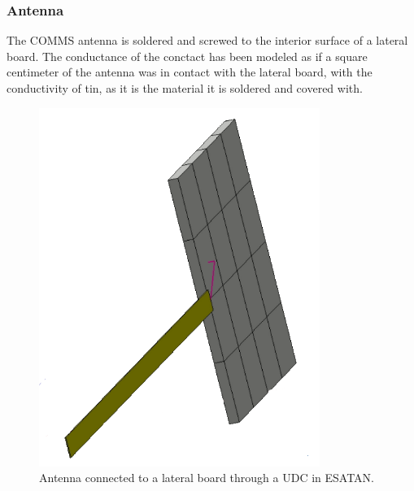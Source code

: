 \subsubsection{Antenna}

The COMMS antenna is soldered and screwed to the interior surface of a lateral board. The conductance of the conctact
has been modeled as if a square centimeter of the antenna was in contact with the lateral board, with the conductivity of
tin, as it is the material it is soldered and covered with.

\begin{figure}[H]
    \centering
    \includegraphics[width=0.3\linewidth]{res/img/5_2_udcs/antennalatudc.PNG}
    \caption{Antenna connected to a lateral board through a UDC in ESATAN.}
    \label{fig:antennaudc}
\end{figure}